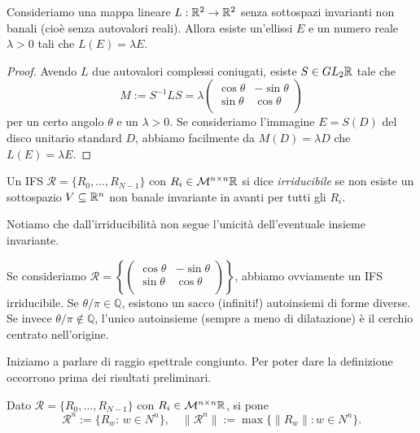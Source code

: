 \begin{lemma}
	Consideriamo una mappa lineare $L:\mathbb{R}^{2}\to \mathbb{R}^{2}$ senza sottospazi invarianti non banali (cioè senza autovalori reali). Allora esiste un'ellissi $E$ e un numero reale $\lambda>0$ tali che $L(E) = \lambda E$.
\end{lemma}
\begin{proof}
	Avendo $L$ due autovalori complessi coniugati, esiste $S\in GL_{2}\mathbb{R}$ tale che 
	$$M := S^{-1}LS = \lambda   \begin{pmatrix} %
	      \cos\theta & -\sin\theta \\
	      \sin\theta & \cos\theta \\
	   \end{pmatrix}$$
	per un certo angolo $\theta$ e un $\lambda>0$. Se consideriamo l'immagine $E = S(D)$ del disco unitario standard $D$, abbiamo facilmente da $M(D) = \lambda D$ che $L(E) = \lambda E$.
\end{proof}

\begin{definizione}
	Un IFS $\mathcal R = \{R_{0}, \dots, R_{N-1}\}$ con $R_{i}\in\mathcal M^{n\times n}\mathbb{R}$ si dice \emph{irriducibile} se non esiste un sottospazio $V\subseteq\mathbb{R}^{n}$ non banale invariante in avanti per tutti gli $R_{i}$.
\end{definizione}

Notiamo che dall'irriducibilità non segue l'unicità dell'eventuale insieme invariante.

\begin{esempio}
	Se consideriamo $\mathcal R = \left\{\begin{pmatrix} %
	      \cos\theta & -\sin\theta \\
	      \sin\theta & \cos\theta \\
	   \end{pmatrix}\right\}$, abbiamo ovviamente un IFS irriducibile. 
	   Se $\theta/\pi\in\mathbb Q$, esistono un sacco (infiniti!) autoinsiemi di forme diverse. Se invece $\theta/\pi\not\in\mathbb Q$, l'unico autoinsieme (sempre a meno di dilatazione) è il cerchio centrato nell'origine.
\end{esempio}

Iniziamo a parlare di raggio spettrale congiunto. Per poter dare la definizione occorrono prima dei risultati preliminari.

Dato $\mathcal R = \{R_{0}, \dots, R_{N-1}\}$ con $R_{i}\in \mathcal M^{n\times n}\mathbb{R}$, si pone 
$$\mathcal R^{n}:=\{R_{w}:\, w\in N^{n}\},\quad \|\mathcal R^{n}\|:=\max\{\|R_{w}\|: w\in N^{n}\}.$$


